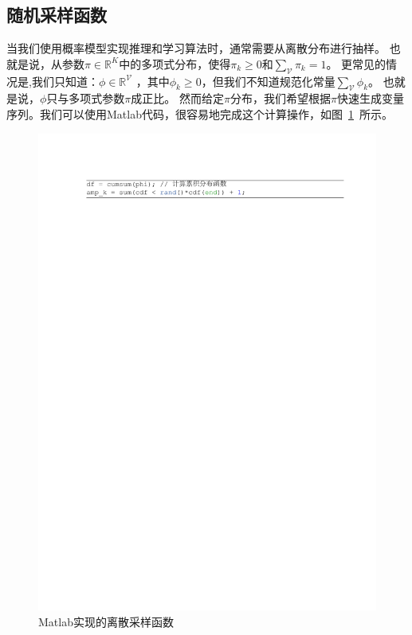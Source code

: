 \subsection{随机采样函数}
当我们使用概率模型实现推理和学习算法时，通常需要从离散分布进行抽样。 也就是说，从参数$ {\pi} \in \mathbb{R}^K$中的多项式分布，使得$\pi_k \geq 0$和$\sum_{\mathcal{V}} \pi_k=1$。 更常见的情况是,我们只知道：$ {\phi}\in \mathbb{R}^{\mathcal{V}}$ ，其中$\phi_k \geq 0$，但我们不知道规范化常量$\sum_{\mathcal{V}} \phi_{k}$。 也就是说，${\phi}$只与多项式参数$ {\pi}$成正比。
然而给定$ {\pi}$分布，我们希望根据${\pi}$快速生成变量序列。我们可以使用Matlab代码，很容易地完成这个计算操作，如图~\ref{fig:sample}~所示。
\begin{figure}[!t]
  \centering
\includegraphics[width=1\linewidth]{./figures/cdf.pdf}
\caption{Matlab实现的离散采样函数}\label{fig:sample}
\end{figure}

